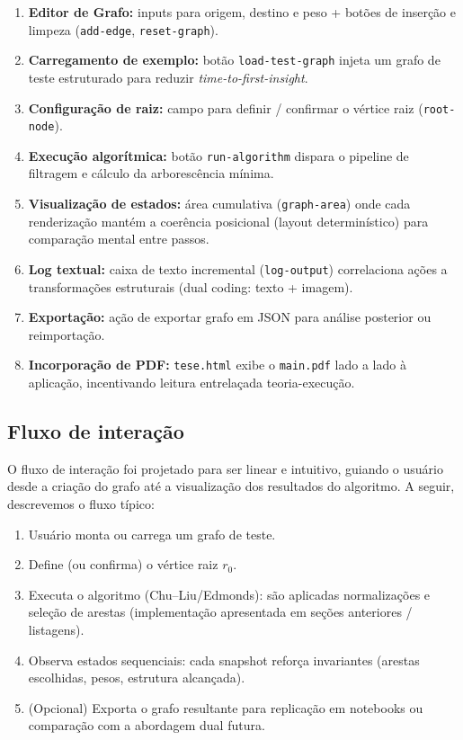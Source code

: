 \begin{enumerate}\setlength{\itemsep}{2pt}
	\item \textbf{Editor de Grafo:} inputs para origem, destino e peso + botões de inserção e limpeza (\texttt{add-edge}, \texttt{reset-graph}).
	\item \textbf{Carregamento de exemplo:} botão \texttt{load-test-graph} injeta um grafo de teste estruturado para reduzir \emph{time-to-first-insight}.
	\item \textbf{Configuração de raiz:} campo para definir / confirmar o vértice raiz (\texttt{root-node}).
	\item \textbf{Execução algorítmica:} botão \texttt{run-algorithm} dispara o pipeline de filtragem e cálculo da arborescência mínima.
	\item \textbf{Visualização de estados:} área cumulativa (\texttt{graph-area}) onde cada renderização mantém a coerência posicional (layout determinístico) para comparação mental entre passos.
	\item \textbf{Log textual:} caixa de texto incremental (\texttt{log-output}) correlaciona ações a transformações estruturais (dual coding: texto + imagem).
	\item \textbf{Exportação:} ação de exportar grafo em JSON para análise posterior ou reimportação.
	\item \textbf{Incorporação de PDF:} \texttt{tese.html} exibe o \texttt{main.pdf} lado a lado à aplicação, incentivando leitura entrelaçada teoria-execução.
\end{enumerate}

\subsection{Fluxo de interação}

O fluxo de interação foi projetado para ser linear e intuitivo, guiando o usuário desde a criação do grafo até a visualização dos resultados do algoritmo. A seguir, descrevemos o fluxo típico:

\begin{enumerate}\setlength{\itemsep}{2pt}
	\item Usuário monta ou carrega um grafo de teste.
	\item Define (ou confirma) o vértice raiz \(r_0\).
	\item Executa o algoritmo (Chu--Liu/Edmonds): são aplicadas normalizações e seleção de arestas (implementação apresentada em seções anteriores / listagens).
	\item Observa estados sequenciais: cada snapshot reforça invariantes (arestas escolhidas, pesos, estrutura alcançada).
	\item (Opcional) Exporta o grafo resultante para replicação em notebooks ou comparação com a abordagem dual futura.
\end{enumerate}

